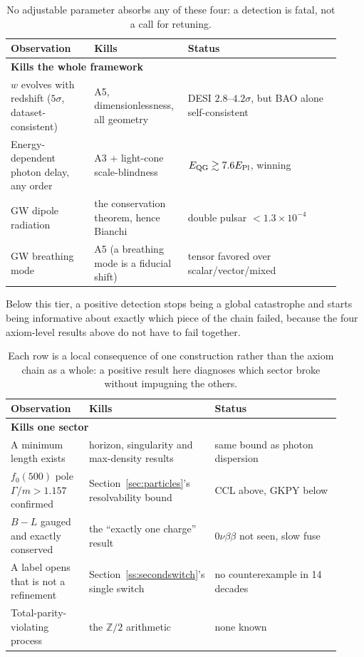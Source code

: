 \documentclass[pdflatex,sn-mathphys-num]{sn-jnl}
\theoremstyle{thmstyleone}
\theoremstyle{thmstylethree}
\theoremstyle{thmstyletwo}
\begin{document}
\begin{table}[htbp]
\centering
\small
\begin{tabular}{p{0.24\linewidth}p{0.24\linewidth}p{0.44\linewidth}}
\toprule
Observation & Kills & Status \\
\midrule
\multicolumn{3}{l}{\textbf{Kills the whole framework}}\\
$w$ evolves with redshift ($5\sigma$, dataset-consistent) & A5, dimensionlessness, all geometry & DESI $2.8$--$4.2\sigma$, but BAO alone self-consistent \\
Energy-dependent photon delay, any order & A3 + light-cone scale-blindness & $E_{\rm QG}\gtrsim7.6E_{\rm Pl}$, winning \\
GW dipole radiation & the conservation theorem, hence Bianchi & double pulsar $<1.3\times10^{-4}$ \\
GW breathing mode & A5 (a breathing mode is a fiducial shift) & tensor favored over scalar/vector/mixed \\
\bottomrule
\end{tabular}
\caption{No adjustable parameter absorbs any of these four: a detection is fatal, not a call for retuning.}
\label{tab:falsify-whole}
\end{table}
\FloatBarrier

Below this tier, a positive detection stops being a global catastrophe
and starts being informative about exactly which piece of the chain
failed, because the four axiom-level results above do not have to fail
together.

\begin{table}[htbp]
\centering
\small
\begin{tabular}{p{0.24\linewidth}p{0.28\linewidth}p{0.40\linewidth}}
\toprule
Observation & Kills & Status \\
\midrule
\multicolumn{3}{l}{\textbf{Kills one sector}}\\
A minimum length exists & horizon, singularity and max-density results & same bound as photon dispersion \\
$f_0(500)$ pole $\Gamma/m>1.157$ confirmed & Section~\ref{sec:particles}'s resolvability bound & CCL above, GKPY below \\
$B{-}L$ gauged and exactly conserved & the ``exactly one charge'' result & $0\nu\beta\beta$ not seen, slow fuse \\
A label opens that is not a refinement & Section~\ref{ss:secondswitch}'s single switch & no counterexample in 14 decades \\
Total-parity-violating process & the $\mathbb{Z}/2$ arithmetic & none known \\
\bottomrule
\end{tabular}
\caption{Each row is a local consequence of one construction rather than the axiom chain as a whole: a positive result here diagnoses which sector broke without impugning the others.}
\label{tab:falsify-sector}
\end{table}
\FloatBarrier
\end{document}
